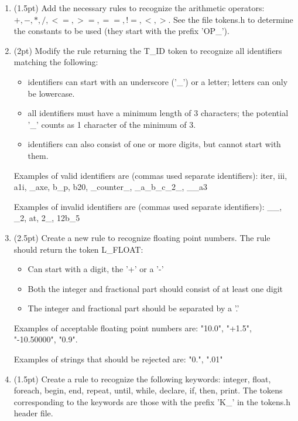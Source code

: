 \documentclass[letter,11pt]{article}
\begin{document}
\begin{enumerate}

\item (1.5pt) Add the necessary rules to recognize the arithmetic operators: $+,-,*,/, <=, >=, ==, !=, <, >$. See the file tokens.h 
to determine the constants to be used (they start with the prefix 'OP\_').

\item (2pt) Modify the rule returning the T\_ID token to recognize all identifiers matching the following:

  \begin{itemize}
    \item identifiers can start with an underscore ('\_') or a letter; letters can only be lowercase.
    \item all identifiers must have a minimum length of 3 characters; the potential '\_' counts as 1 character of the minimum of 3.
    \item identifiers can also consist of one or more digits, but cannot start with them.
  \end{itemize}

  Examples of valid identifiers are (commas used separate identifiers): iter, iii, a1i, \_axe, b\_p, b20, \_counter\_, \_a\_b\_c\_2\_, \_\_a3

  Examples of invalid identifiers are (commas used separate identifiers): \_\_, \_2, at, 2\_, 12b\_5

\item (2.5pt) Create a new rule to recognize floating point numbers. The rule should return the token L\_FLOAT:

  \begin{itemize}
    \item Can start with a digit, the '+' or a '-'
    \item Both the integer and fractional part should consist of at least one digit
    \item The integer and fractional part should be separated by a '.'
  \end{itemize}

  Examples of acceptable floating point numbers are: "10.0", "+1.5", "-10.50000", "0.9". 

  Examples of strings that should be rejected are: "0.", ".01" 

\item (1.5pt) Create a rule to recognize the following keywords: integer, float, foreach, begin, end, repeat, until, while, declare, if, then, print.
  The tokens corresponding to the keywords are those with the prefix 'K\_' in the tokens.h header file.

\end{enumerate}
\end{document}
